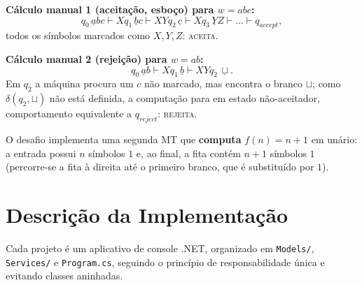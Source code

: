 \documentclass[12pt,a4paper]{article}
\begin{document}
\noindent\textbf{Cálculo manual 1 (aceitação, esboço) para $w = abc$:}
\[
q_0\,\underline{a}bc \vdash X q_1\,\underline{b}c \vdash XY q_2\,\underline{c}
\vdash X q_3\,\underline{Y}Z \vdash \dots \vdash q_{accept},
\]
todos os símbolos marcados como $X,Y,Z$: \textsc{aceita}.

\noindent\textbf{Cálculo manual 2 (rejeição) para $w = ab$:}
\[
q_0\,\underline{a}b \vdash X q_1\,\underline{b} \vdash XY q_2\,\underline{\sqcup}.
\]
Em $q_2$ a máquina procura um $c$ não marcado, mas encontra o branco $\sqcup$;
como $\delta(q_2, \sqcup)$ não está definida, a computação para em estado
não-aceitador, comportamento equivalente a $q_{reject}$: \textsc{rejeita}.

O desafio implementa uma segunda MT que \textbf{computa} $f(n) = n+1$ em unário:
a entrada possui $n$ símbolos $1$ e, ao final, a fita contém $n+1$ símbolos $1$
(percorre-se a fita à direita até o primeiro branco, que é substituído por $1$).

\section{Descrição da Implementação}
Cada projeto é um aplicativo de console .NET, organizado em \texttt{Models/},
\texttt{Services/} e \texttt{Program.cs}, seguindo o princípio de
responsabilidade única e evitando classes aninhadas.
\end{document}
